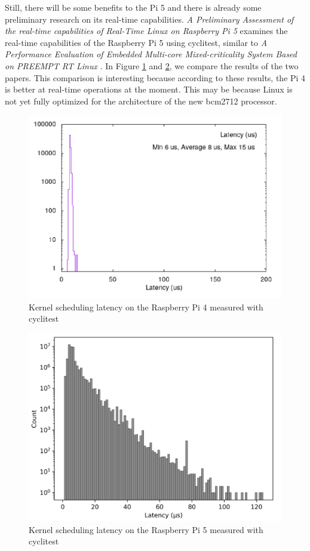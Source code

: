 Still, there will be some benefits to the Pi 5 and there is already some preliminary research on its real-time capabilities.
\textit{A Preliminary Assessment of the real-time capabilities of Real-Time Linux on Raspberry Pi 5} \cite{Rasp5} examines the real-time capabilities of the Raspberry Pi 5 using cyclitest,
similar to \textit{A Performance Evaluation of Embedded Multi-core Mixed-criticality System Based on PREEMPT RT Linux} \cite{Rasp4}.
In Figure \ref{fig:rasp4} and \ref{fig:rasp5}, we compare the results of the two papers.
This comparison is interesting because according to these results, the Pi 4 is better at real-time operations at the moment.
This may be because Linux is not yet fully optimized for the architecture of the new bcm2712 processor.

\begin{figure}
  \begin{center}
    \includegraphics[width=.8\textwidth]{assets/Rasp4.png}
    \caption{Kernel scheduling latency on the Raspberry Pi 4 measured with cyclitest \cite{Rasp4}}
    \label{fig:rasp4}
  \end{center}
\end{figure}

\begin{figure}
  \begin{center}
    \includegraphics[width=.8\textwidth]{assets/Rasp5.png}
    \caption{Kernel scheduling latency on the Raspberry Pi 5 measured with cyclitest \cite{Rasp5}}
    \label{fig:rasp5}
  \end{center}
\end{figure}

